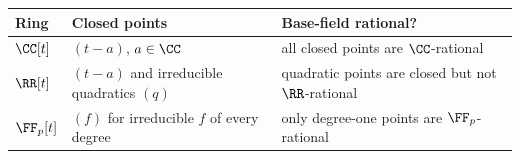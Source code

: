 \begin{center}
\renewcommand{\arraystretch}{1.2}
\begin{tabular}{p{}p{}p{}}
\toprule
\textbf{Ring} & \textbf{Closed points} & \textbf{Base-field rational?}\\
\midrule
$\CC[t]$ & $(t-a)$, $a\in\CC$ & all closed points are $\CC$-rational\\
$\RR[t]$ & $(t-a)$ and irreducible quadratics $(q)$ & quadratic points are closed but not $\RR$-rational\\
$\FF_p[t]$ & $(f)$ for irreducible $f$ of every degree & only degree-one points are $\FF_p$-rational\\
\bottomrule
\end{tabular}
\end{center}
